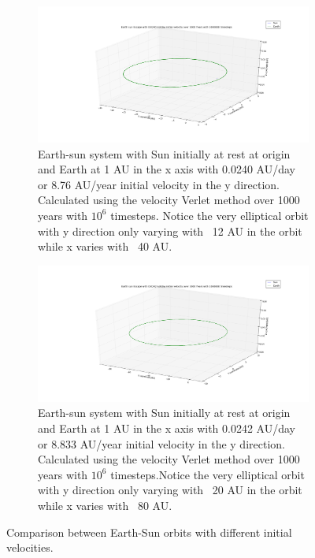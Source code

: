 \documentclass[a4paper,11pt]{article}
\begin{document}
{\begin{figure}[H]
	\centering
	\begin{subfigure}[b]{1\textwidth}
		\includegraphics[scale=0.3]{figure_6}
		\caption{Earth-sun system with Sun initially at rest at origin and Earth at 1 AU in the x axis with 0.0240 AU/day or 8.76 AU/year initial velocity in the y direction. Calculated using the velocity Verlet method over 1000 years with $10^{6}$ timesteps. Notice the very elliptical orbit with y direction only varying with ~12 AU in the orbit while x varies with ~40 AU.}
		\label{fig:E_S_escape1}
	\end{subfigure}
	\begin{subfigure}[b]{1\textwidth}
		\includegraphics[scale=0.3]{figure_7}
		\caption{Earth-sun system with Sun initially at rest at origin and Earth at 1 AU in the x axis with 0.0242 AU/day or 8.833 AU/year initial velocity in the y direction. Calculated using the velocity Verlet method over 1000 years with $10^{6}$ timesteps.Notice the very elliptical orbit with y direction only varying with ~20 AU in the orbit while x varies with ~80 AU.}
		\label{fig:E_S_escape2}
	\end{subfigure}
	\caption{Comparison between Earth-Sun orbits with different initial velocities.}
	\label{fig:E_S_escape}
\end{figure}

}
\end{document}
